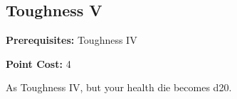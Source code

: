 \subsection*{Toughness V}\label{feat:toughness5}

\noindent
\textbf{Prerequisites:} Toughness IV

\noindent
\textbf{Point Cost:} 4 

As Toughness IV, but your health die becomes d20.

